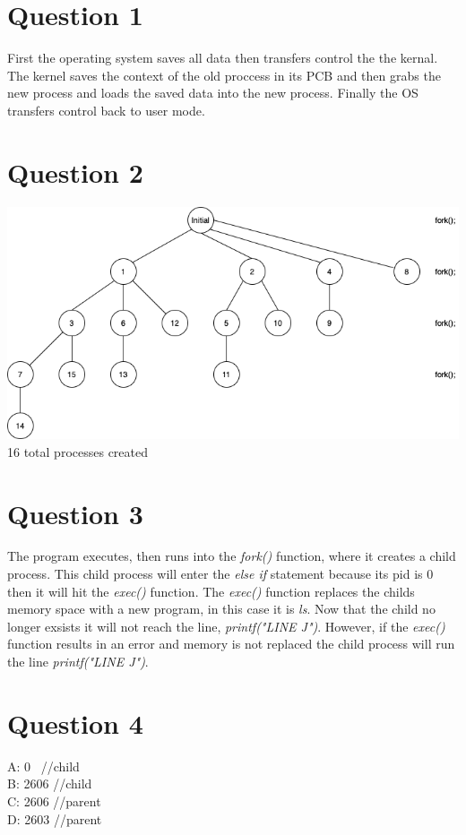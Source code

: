 \documentclass[11pt]{article}
\begin{document}
\maketitle


\section*{Question 1}
    First the operating system saves all data then transfers 
    control the the kernal. The kernel saves the context of 
    the old proccess in its PCB and then grabs the new process 
    and loads the saved data into the new process. Finally the 
    OS transfers control back to user mode.
\section*{Question 2}
\includegraphics[scale=0.52]{COMS352HW2Q2}
16 total processes created 

\newpage
\section*{Question 3}
    The program executes, then runs into the \emph{fork()} function,
    where it creates a child process. This child process will enter 
    the \emph{else if} statement because its pid is 0 then it will
    hit the \emph{exec()} function. The \emph{exec()} function replaces
    the childs memory space with a new program, in this case it is
    \emph{ls}. Now that the child no longer exsists it will not reach 
    the line, \emph{printf("LINE J")}. However, if the \emph{exec()}
    function results in an error and memory is not replaced the
    child process will run the line \emph{printf("LINE J")}.
\section*{Question 4}
A: 0    \, \quad \qquad  //child\\
B: 2606 \qquad //child\\
C: 2606 \qquad //parent\\
D: 2603 \qquad //parent\\
\end{document}
